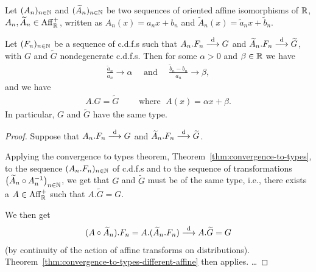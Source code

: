 \begin{corollary}
  \label{cor:convergence-to-types-different-limit}
  Let $(A_n)_{n \in \mathbb{N}}$ and
  $(\widetilde{A}_n)_{n \in \mathbb{N}}$ be two sequences of oriented
  affine isomorphisms of $\mathbb{R}$, $A_n, \widetilde{A}_n \in \mathrm{Aff}^+_{\mathbb{R}}$,
  written as $A_n(x) = a_n x + b_n$
  and $\widetilde{A}_n(x) = \tilde{a}_n x + \tilde{b}_n$.

  Let $(F_n)_{n \in \mathbb{N}}$ be a sequence of c.d.f.s
  such that $A_n.F_n \overset{\mathrm{d}}{\longrightarrow} G$ and
  $\widetilde{A}_n.F_n \overset{\mathrm{d}}{\longrightarrow} \widetilde{G}$, with
  $G$ and $\widetilde{G}$ nondegenerate c.d.f.s.
  Then for some $\alpha>0$ and $\beta \in \mathbb{R}$ we have
  \begin{align*}
    \frac{\tilde{a}_n}{a_n} \to \alpha
    \quad \text{ and } \quad
    \frac{\tilde{b}_n - b_n}{a_n} \to \beta ,
  \end{align*}
  and we have
  \begin{align*}
    A.G = \widetilde{G}
    \qquad \text{ where } \; A(x) = \alpha x + \beta .
  \end{align*}
  In particular, $G$ and $\widetilde{G}$ have the same type.
\end{corollary}
\begin{proof}
  Suppose that $A_n.F_n \overset{\mathrm{d}}{\longrightarrow} G$ and
  $\widetilde{A}_n.F_n \overset{\mathrm{d}}{\longrightarrow} \widetilde{G}$.

  Applying the convergence to types theorem,
  Theorem~\ref{thm:convergence-to-types}, to the sequence $(A_n.F_n)_{n \in \mathbb{N}}$
  of c.d.f.s and to the sequence of transformations
  $\big( \widetilde{A}_n \circ A_n^{-1} \big)_{n \in \mathbb{N}}$, we get that
  $G$ and $\widetilde{G}$ must be of the same type, i.e., there exists a
  $A \in \mathrm{Aff}^+_{\mathbb{R}}$ such that $A.\widetilde{G} = G$.

  We then get
  \begin{align*}
    (A \circ \widetilde{A}_n).F_n = A.(\widetilde{A}_n.F_n) \overset{\mathrm{d}}{\longrightarrow} A.\widetilde{G} = G
  \end{align*}
  (by continuity of the action of affine transforms on distributions).
  Theorem~\ref{thm:convergence-to-types-different-affine} then applies.
  \ldots
\end{proof}

